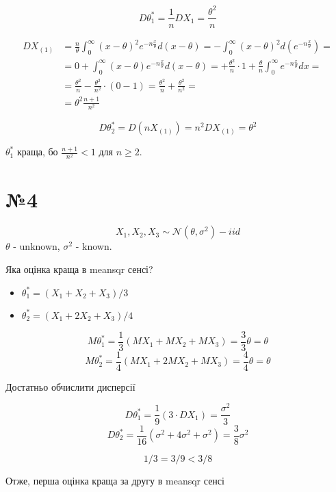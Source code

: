 \documentclass[11pt, a4paper]{article} %
\begin{document}
$$D\theta^*_1 = \frac{1}{n} DX_1 = \frac{\theta^2}{n}$$

\begin{align*}    
    DX_{(1)} &= \frac{n}{\theta} \int_0^\infty (x-\theta)^2 e^{-n\frac{x}{\theta}} d(x-\theta) 
    =  -\int_0^\infty (x-\theta)^2 d\left(e^{-n\frac{x}{\theta}}\right) = \\
    &= 0 + \int_0^\infty (x-\theta) e^{-n\frac{x}{\theta}} d(x-\theta)
    = +\frac{\theta^2}{n} \cdot 1 + \frac{\theta}{n} \int_0^\infty e^{-n\frac{x}{\theta}} dx = \\
    &= \frac{\theta^2}{n} -\frac{\theta^2}{n^2} \cdot (0-1) = \frac{\theta^2}{n} + \frac{\theta^2}{n^2} = \\
    &= \theta^2 \frac{n+1}{n^2}
    \end{align*}

$$D\theta^*_2 = D\left(nX_{(1)}\right) = n^2 DX_{(1)} = \theta^2$$

\begin{mdframed}[style=ans]
    $\theta^*_1$ краща, бо $\frac{n+1}{n^2} < 1$ для $n\ge 2$.
\end{mdframed}

\section*{№4}
\begin{mdframed}
    $$X_1, X_2, X_3 \sim \mathcal N(\theta, \sigma^2) - iid$$
    $\theta$ - unknown, $\sigma^2$ - known.

    Яка оцінка краща в meansqr сенсі?
    \begin{itemize}
        \item $\theta^*_1 = (X_1 + X_2 + X_3)/3$
        \item $\theta^*_2 = (X_1 + 2X_2 + X_3)/4$
    \end{itemize}
\end{mdframed}

$$M\theta^*_1 = \frac{1}{3}(MX_1 + MX_2 + MX_3) = \frac{3}{3}\theta = \theta$$
$$M\theta^*_2 = \frac{1}{4}(MX_1 + 2MX_2 + MX_3) = \frac{4}{4}\theta = \theta$$

Достатньо обчислити дисперсії

$$D\theta^*_1 = \frac{1}{9}(3\cdot DX_1) = \frac{\sigma^2}{3}$$
$$D\theta^*_2 = \frac{1}{16}(\sigma^2 + 4 \sigma^2 + \sigma^2) = \frac{3}{8}\sigma^2$$

$$1/3 = 3/9 < 3/8$$
\begin{mdframed}[style=ans]
    Отже, перша оцінка краща за другу в meansqr сенсі
\end{mdframed}
\end{document}
